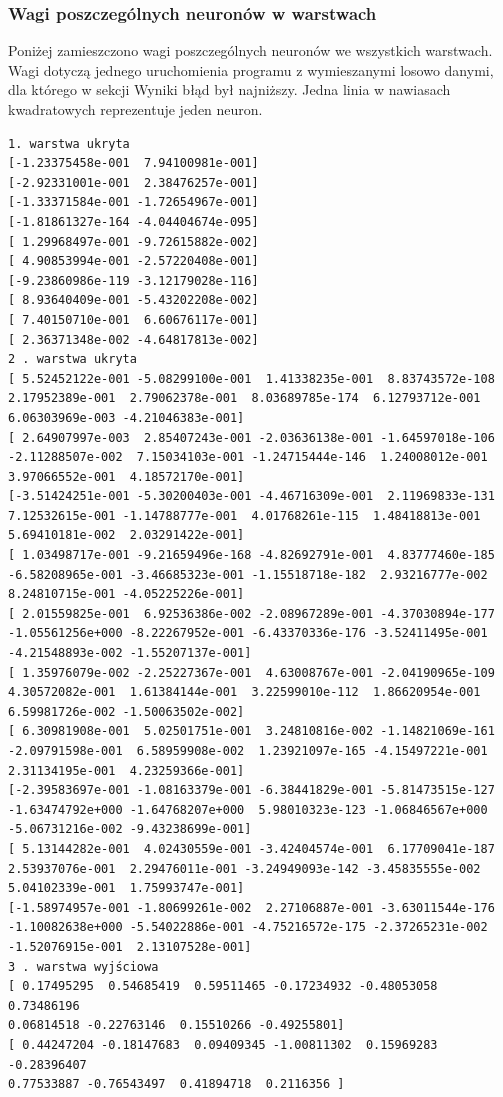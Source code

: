 \documentclass{classrep}
\begin{document}
\subsubsection{Wagi poszczególnych neuronów w warstwach} 
Poniżej zamieszczono wagi poszczególnych neuronów we wszystkich warstwach. Wagi dotyczą jednego uruchomienia programu z wymieszanymi losowo danymi, dla którego w sekcji Wyniki błąd był najniższy. Jedna linia w nawiasach kwadratowych reprezentuje jeden neuron.
\begin{verbatim}
1. warstwa ukryta
[-1.23375458e-001  7.94100981e-001]
[-2.92331001e-001  2.38476257e-001]
[-1.33371584e-001 -1.72654967e-001]
[-1.81861327e-164 -4.04404674e-095]
[ 1.29968497e-001 -9.72615882e-002]
[ 4.90853994e-001 -2.57220408e-001]
[-9.23860986e-119 -3.12179028e-116]
[ 8.93640409e-001 -5.43202208e-002]
[ 7.40150710e-001  6.60676117e-001]
[ 2.36371348e-002 -4.64817813e-002]
2 . warstwa ukryta
[ 5.52452122e-001 -5.08299100e-001  1.41338235e-001  8.83743572e-108
2.17952389e-001  2.79062378e-001  8.03689785e-174  6.12793712e-001
6.06303969e-003 -4.21046383e-001]
[ 2.64907997e-003  2.85407243e-001 -2.03636138e-001 -1.64597018e-106
-2.11288507e-002  7.15034103e-001 -1.24715444e-146  1.24008012e-001
3.97066552e-001  4.18572170e-001]
[-3.51424251e-001 -5.30200403e-001 -4.46716309e-001  2.11969833e-131
7.12532615e-001 -1.14788777e-001  4.01768261e-115  1.48418813e-001
5.69410181e-002  2.03291422e-001]
[ 1.03498717e-001 -9.21659496e-168 -4.82692791e-001  4.83777460e-185
-6.58208965e-001 -3.46685323e-001 -1.15518718e-182  2.93216777e-002
8.24810715e-001 -4.05225226e-001]
[ 2.01559825e-001  6.92536386e-002 -2.08967289e-001 -4.37030894e-177
-1.05561256e+000 -8.22267952e-001 -6.43370336e-176 -3.52411495e-001
-4.21548893e-002 -1.55207137e-001]
[ 1.35976079e-002 -2.25227367e-001  4.63008767e-001 -2.04190965e-109
4.30572082e-001  1.61384144e-001  3.22599010e-112  1.86620954e-001
6.59981726e-002 -1.50063502e-002]
[ 6.30981908e-001  5.02501751e-001  3.24810816e-002 -1.14821069e-161
-2.09791598e-001  6.58959908e-002  1.23921097e-165 -4.15497221e-001
2.31134195e-001  4.23259366e-001]
[-2.39583697e-001 -1.08163379e-001 -6.38441829e-001 -5.81473515e-127
-1.63474792e+000 -1.64768207e+000  5.98010323e-123 -1.06846567e+000
-5.06731216e-002 -9.43238699e-001]
[ 5.13144282e-001  4.02430559e-001 -3.42404574e-001  6.17709041e-187
2.53937076e-001  2.29476011e-001 -3.24949093e-142 -3.45835555e-002
5.04102339e-001  1.75993747e-001]
[-1.58974957e-001 -1.80699261e-002  2.27106887e-001 -3.63011544e-176
-1.10082638e+000 -5.54022886e-001 -4.75216572e-175 -2.37265231e-002
-1.52076915e-001  2.13107528e-001]
3 . warstwa wyjściowa
[ 0.17495295  0.54685419  0.59511465 -0.17234932 -0.48053058  0.73486196
0.06814518 -0.22763146  0.15510266 -0.49255801]
[ 0.44247204 -0.18147683  0.09409345 -1.00811302  0.15969283 -0.28396407
0.77533887 -0.76543497  0.41894718  0.2116356 ]

\end{verbatim}
\end{document}
